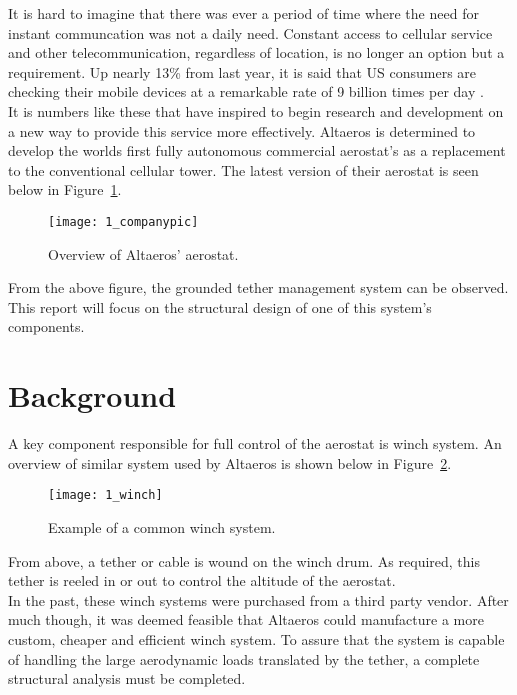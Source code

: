 \label{chapt:intro}

It is hard to imagine that there was ever a period of time where the need for instant communcation was not a daily need. Constant access to cellular service and other telecommunication, regardless of location, is no longer an option but a requirement. Up nearly 13\% from last year, it is said that US consumers are checking their mobile devices at a remarkable rate of 9 billion times per day \cite{deloittestat}.\\

It is numbers like these that have inspired \Company to begin research and development on a new way to provide this service more effectively. Altaeros is determined to develop the worlds first fully autonomous commercial aerostat's as a replacement to the conventional cellular tower. The latest version of their aerostat is seen below in Figure~\ref{fig:1_companypic}.

\begin{figure}[H]
	\centering
	\texttt{[image: 1\_companypic]}
	\caption[Overview of Altaeros' aerostat.]{Overview of Altaeros' aerostat.\protect\cite{companypicweb}}
	\label{fig:1_companypic}
\end{figure}

From the above figure, the grounded tether management system can be observed. This report will focus on the structural design of one of this system's components.

\section{Background} 

A key component responsible for full control of the aerostat is winch system. An overview of similar system used by Altaeros is shown below in Figure~\ref{fig:1_winch}.
\begin{figure}[H]
	\centering
	\texttt{[image: 1\_winch]}
	\caption[Example of a common winch system.]{Example of a common winch system.\protect\cite{winchpic}}
	\label{fig:1_winch}
\end{figure}

From above, a tether or cable is wound on the winch drum. As required, this tether is reeled in or out to control the altitude of the aerostat.\\

In the past, these winch systems were purchased from a third party vendor. After much though, it was deemed feasible that Altaeros could manufacture a more custom, cheaper and efficient winch system. To assure that the system is capable of handling the large aerodynamic loads translated by the tether, a complete structural analysis must be completed.

